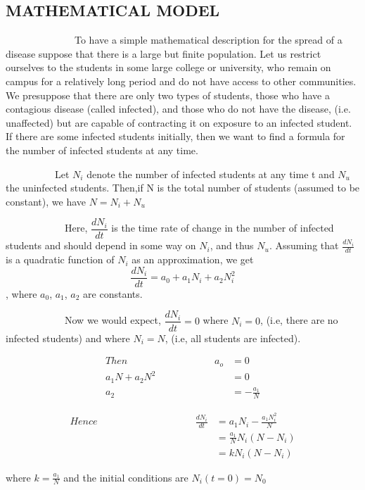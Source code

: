 \subsection*{MATHEMATICAL MODEL}

\par ~~~~~~~~~~~~~~To have a simple mathematical description for the spread of a disease suppose that there is a large but finite population. Let us restrict ourselves to the students in some large college or university, who remain on campus for a relatively long period and do not have access to other communities. We presuppose that there are     only two types of students, those who have a contagious disease (called infected), and those who do not have the disease, (i.e. unaffected) but are capable of contracting it on exposure to an infected student. If there are some infected students initially, then we want to find a formula for the number of infected students at any time.

\par ~~~~~~~~~~Let $N_{i}$ denote the number of infected students at any time t and $N_{u}$ the uninfected students. Then,if N is the total number of students (assumed to be constant), we have $N=N_{i}+N_{u}$

\par ~~~~~~~~~~~~Here, $\dfrac{dN_{i}}{dt}$ is the time rate of change in the number of infected students and should depend in some way on $N_{i}$, and thus $N_{u}$. Assuming that $\frac{dN_{i}}{dt}$ is a quadratic function of $N_{i}$ as an approximation, we get     
$$\frac{dN_{i}}{dt}=a_{0}+a_{1}N_{i}+a_{2}N_{i}^{2}$$,
where $a_{0}$, $a_{1}$, $a_{2}$ are constants.  \\                                              
\par ~~~~~~~~~~~~Now we would expect, $\dfrac{dN_{i}}{dt}=0$  where $N_{i}=0$, (i.e, there are no infected students) and where $N_{i}=N$, (i.e, all students are infected).      
 \begin{center}
	\begin{eqnarray*}
			Then ~~~~~~~~~~~~~~~~~~~~~~~~~~~~~~~~~~~~~~~~a_{o}&=0 \\
			a_{1}N+a_{2}N^{2}&=0 \\
			a_{2}&=-\frac{a_{1}}{N} 
	\end{eqnarray*}
\end{center}

\begin{center}
	\begin{eqnarray*}
			Hence~~~~~~~~~~~~~~~~~~~~~~~~~~~~~~~~~~~~~~~~~~~~~ \frac{dN_{i}}{dt}&=a_{1}N_{i}-\frac{a_{1}N_{i}^{2}}{N}  \\
			&=\frac{a_{1}}{N}N_{i}(N-N_{i}) \\
	 		&=kN_{i}(N-N_{i})
	 \end{eqnarray*}
\end{center}                   
where $k = \frac{a_{1}}{N}$ and the initial conditions are $N_{i}(t=0)=N_{0}$

